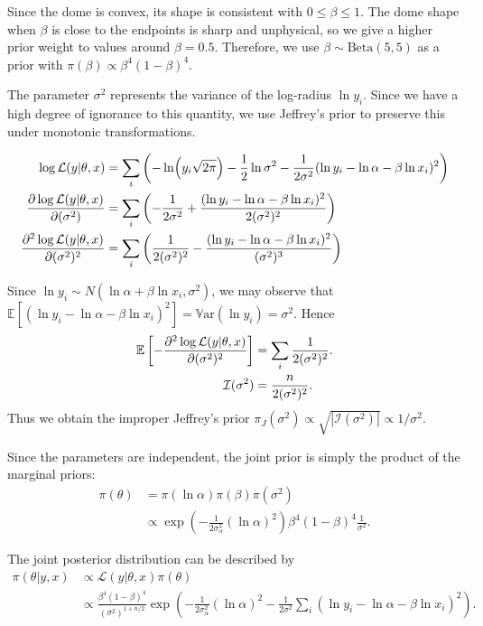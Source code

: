 \documentclass{article}
\newcommand{\E}{\mathbb{E}}
\newcommand{\Var}{\mathbb{V}\mathrm{ar}}
\begin{document}
Since the dome is convex, its shape is consistent with $0 \leq \beta \leq 1$.
The dome shape when $\beta$ is close to the endpoints is sharp and unphysical, so we give a higher prior weight to values around $\beta = 0.5$.
Therefore, we use $\beta \sim \mathrm{Beta}(5,5)$ as a prior with $\pi(\beta) \propto \beta^4 (1-\beta)^4$.

The parameter $\sigma^2$ represents the variance of the log-radius $\ln y_i$.
Since we have a high degree of ignorance to this quantity, we use Jeffrey's prior to preserve this under monotonic transformations.

\begin{align*}
    \log\mathcal{L}(y|\theta,x) &= \sum_i \left( -\ln(y_i\sqrt{2\pi}) - \frac12\ln\sigma^2 - \frac{1}{2\sigma^2} (\ln y_i - \ln\alpha - \beta\ln x_i)^2 \right) \\
    \pdv{\log\mathcal{L}(y|\theta,x)}{(\sigma^2)} &= \sum_i \left( -\frac{1}{2\sigma^2} + \frac{(\ln y_i - \ln\alpha - \beta\ln x_i)^2}{2(\sigma^2)^2} \right) \\
    \pdv[2]{\log\mathcal{L}(y|\theta,x)}{(\sigma^2)} &= \sum_i \left( \frac{1}{2(\sigma^2)^2} - \frac{(\ln y_i - \ln\alpha - \beta\ln x_i)^2}{(\sigma^2)^3} \right)
\end{align*}

Since $\ln y_i \sim N(\ln\alpha + \beta\ln x_i, \sigma^2)$, we may observe that $\E[(\ln y_i - \ln\alpha - \beta\ln x_i)^2] = \Var(\ln y_i) = \sigma^2$.
Hence
\begin{align*}
    \E \left[ -\pdv[2]{\log\mathcal{L}(y|\theta,x)}{(\sigma^2)} \right] &= \sum_i \frac{1}{2(\sigma^2)^2}. \\
    \mathcal{I}(\sigma^2) &= \frac{n}{2(\sigma^2)^2}.
\end{align*}
Thus we obtain the improper Jeffrey's prior $\pi_J(\sigma^2) \propto \sqrt{|\mathcal{I}(\sigma^2)|} \propto 1/\sigma^2$.

Since the parameters are independent, the joint prior is simply the product of the marginal priors:
\begin{align*}
    \pi(\theta) &= \pi(\ln\alpha) \pi(\beta) \pi(\sigma^2) \\
    &\propto \exp(-\frac{1}{2\sigma_\alpha^2} (\ln\alpha)^2) \beta^ 4(1-\beta)^4 \frac{1}{\sigma^2}.
\end{align*}

The joint posterior distribution can be described by
\begin{align*}
    \pi(\theta|y,x) &\propto \mathcal{L}(y|\theta,x) \pi(\theta) \\
    &\propto \frac{\beta^ 4(1-\beta)^4}{(\sigma^2)^{1+n/2}} \exp(-\frac{1}{2\sigma_\alpha^2} (\ln\alpha)^2 - \frac{1}{2\sigma^2} \sum_i (\ln y_i - \ln\alpha - \beta\ln x_i)^2).
\end{align*}
\end{document}

